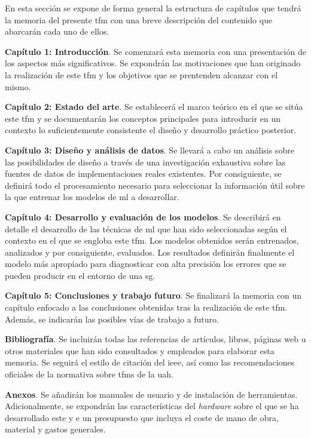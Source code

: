 En esta sección se expone de forma general la estructura de capítulos que tendrá la memoria del presente \gls{tfm} con una breve descripción del contenido que abarcarán cada uno de ellos.


\begin{description}
    \item\textbf{Capítulo 1: Introducción}. Se comenzará esta memoria con una presentación de los aspectos más significativos. Se expondrán las motivaciones que han originado la realización de este \gls{tfm} y los objetivos que se prentenden alcanzar con el mismo.

    \item\textbf{Capítulo 2: Estado del arte}. Se establecerá el marco teórico en el que se sitúa este \gls{tfm} y se documentarán los conceptos principales para introducir en un contexto lo suficientemente consistente el diseño y desarrollo práctico posterior.

    \item\textbf{Capítulo 3: Diseño y análisis de datos}. Se llevará a cabo un análisis sobre las posibilidades de diseño a través de una investigación exhaustiva sobre las fuentes de datos de implementaciones reales existentes. Por consiguiente, se definirá todo el procesamiento necesario para seleccionar la información útil sobre la que entrenar los modelos de \gls{ml} a desarrollar. 
    

    \item\textbf{Capítulo 4: Desarrollo y evaluación de los modelos}. Se describirá en detalle el desarrollo de las técnicas de \gls{ml} que han sido seleccionadas según el contexto en el que se engloba este \gls{tfm}. Los modelos obtenidos serán entrenados, analizados y por consiguiente, evaluados. Los resultados definirán finalmente el modelo más apropiado para diagnosticar con alta precisión los errores que se pueden producir en el entorno de una \gls{sg}.
    
    \item\textbf{Capítulo 5: Conclusiones y trabajo futuro}. Se finalizará la memoria con un capítulo enfocado a las conclusiones obtenidas tras la realización de este \gls{tfm}. Además, se indicarán las posibles vías de trabajo a futuro.

    \item[]\textbf{Bibliografía}. Se incluirán todas las referencias de artículos, libros, páginas web u otros materiales que han sido consultados y empleados para elaborar esta memoria. Se seguirá el estilo de citación del \gls{ieee}, así como las recomendaciones oficiales de la normativa sobre \gls{tfm}s de la \gls{uah}.
    


    

    \item[]\textbf{Anexos}. Se añadirán los manuales de usuario y de instalación de herramientas. Adicionalmente, se expondrán las características del \textit{hardware} sobre el que se ha desarrollado este  y e un presupuesto que incluya el coste de mano de obra, material y gastos generales.
\end{description}

